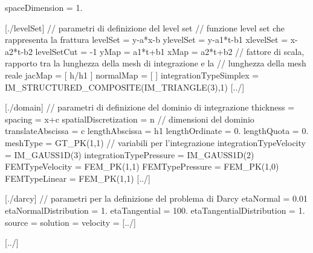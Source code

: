 \begin{Code03_01}[caption={Definizione della frattura}]
[fractureData]

spaceDimension = 1.

   [./levelSet]		// parametri di definizione del level set
     // funzione level set che rappresenta la frattura
     levelSet = y-a*x-b 			
     ylevelSet = y-a1*t-b1 			
     xlevelSet = x-a2*t-b2				          
     levelSetCut = -1	
     yMap = a1*t+b1					
     xMap = a2*t+b2				
     // fattore di scala, rapporto tra la lunghezza della mesh di integrazione e la 
     // lunghezza della mesh reale
     jacMap = [ h/h1 ]				
     normalMap = [ ]					
     integrationTypeSimplex = IM_STRUCTURED_COMPOSITE(IM_TRIANGLE(3),1)
   [../]

   [./domain]		// parametri di definizione del dominio di integrazione
     thickness = 
     spacing = x+c      	
     spatialDiscretization = n
     // dimensioni del dominio
     translateAbscissa = c
     lengthAbscissa = h1
     lengthOrdinate = 0.
     lengthQuota = 0.
     meshType = GT_PK(1,1)
     // variabili per l'integrazione
     integrationTypeVelocity = IM_GAUSS1D(3)
     integrationTypePressure = IM_GAUSS1D(2)		
     FEMTypeVelocity = FEM_PK(1,1)
     FEMTypePressure = FEM_PK(1,0)
     FEMTypeLinear = FEM_PK(1,1)
   [../]

   [./darcy]		// parametri per la definizione del problema di Darcy
     etaNormal = 0.01
     etaNormalDistribution = 1. 
     etaTangential = 100.
     etaTangentialDistribution = 1.
     source = 
     solution = 
     velocity = 
   [../]

[../]

\end{Code03_01}

